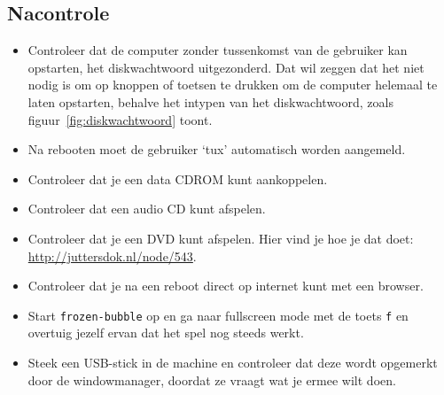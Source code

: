 \subsection{Nacontrole}
\begin{itemize}
	\item Controleer dat de computer zonder tussenkomst van de gebruiker kan opstarten, het diskwachtwoord uitgezonderd. Dat wil zeggen dat het niet nodig is om op knoppen of toetsen te drukken om de computer helemaal te laten opstarten, behalve het intypen van het diskwachtwoord, zoals figuur~\ref{fig:diskwachtwoord} toont.
	\item Na rebooten moet de gebruiker `tux' automatisch worden aangemeld.
	\item Controleer dat je een data CDROM kunt aankoppelen.
  \item Controleer dat een audio CD kunt afspelen.
  \item Controleer dat je een DVD kunt afspelen. Hier vind je hoe je dat doet:\\ \url{http://juttersdok.nl/node/543}.
	\item Controleer dat je na een reboot direct op internet kunt met een browser.
	\item Start \texttt{frozen-bubble} op en ga naar fullscreen mode met de toets \texttt{f} en overtuig jezelf ervan dat het spel nog steeds werkt.
  \item Steek een USB-stick in de machine en controleer dat deze wordt opgemerkt door de windowmanager, doordat ze vraagt wat je ermee wilt doen.
\end{itemize}
